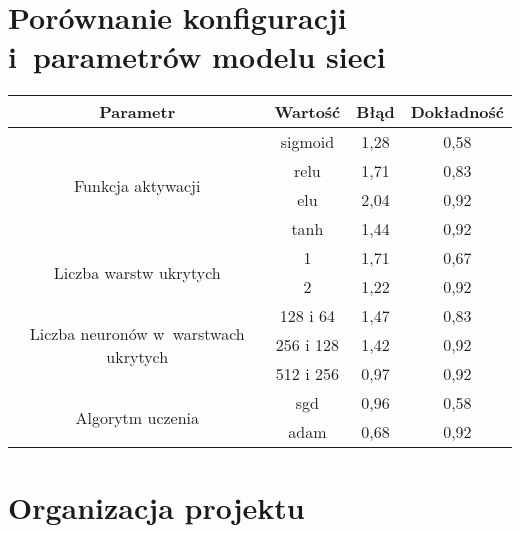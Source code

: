 \chapter{Porównanie konfiguracji i~parametrów modelu sieci}
\label{ch:nn_comparison_table}
\begin{table}[!h]
    \centering
    \begin{tabular}{c|c|c|c}
        \toprule
        Parametr & Wartość   & Błąd & Dokładność \\
        \midrule
        \multirow{4}{*}{Funkcja aktywacji}                 
            & sigmoid   & 1,28 & 0,58       \\
            & relu      & 1,71 & 0,83       \\
            & elu       & 2,04 & 0,92       \\
            & tanh      & 1,44 & 0,92       \\
        \midrule
        \multirow{2}{*}{Liczba warstw ukrytych}
            & 1         & 1,71 & 0,67       \\
            & 2         & 1,22 & 0,92       \\
        \midrule
        \multirow{3}{*}{\parbox{5cm}
            {\centering Liczba neuronów w~warstwach ukrytych}}
            & 128 i 64  & 1,47 & 0,83       \\
            & 256 i 128 & 1,42 & 0,92       \\
            & 512 i 256 & 0,97 & 0,92       \\
        \midrule
        \multirow{2}{*}{Algorytm uczenia}            
            & sgd       & 0,96 & 0,58       \\
            & adam      & 0,68 & 0,92       \\
        \bottomrule
    \end{tabular}
\end{table}

\chapter{Organizacja projektu}
\label{ch:project_structure}
